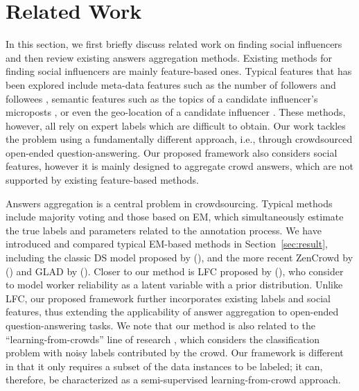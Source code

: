 \section{Related Work}

In this section, we first briefly discuss related work on finding social influencers and then review existing answers aggregation methods. Existing methods for finding social influencers are mainly feature-based ones. Typical features that has been explored include meta-data features such as the number of followers and followees \cite{Lehmann2013,Cheng2014}, semantic features such as the topics of a candidate influencer's microposts \cite{riahi2012finding,wei2016learning}, or even the geo-location of a candidate influencer \cite{Cheng2014} . These methods, however, all rely on expert labels which are difficult to obtain. Our work tackles the problem using a fundamentally different approach, i.e., through crowdsourced open-ended question-answering. Our proposed framework also considers social features, however it is mainly designed to aggregate crowd answers, which are not supported by existing feature-based methods.


Answers aggregation is a central problem in crowdsourcing. Typical methods include majority voting \cite{sheng2008get} and those based on EM, which simultaneously estimate the true labels and parameters related to the annotation process. We have introduced and compared typical EM-based methods in Section~\ref{sec:result}, including the classic DS model proposed by \citeauthor{dawid1979maximum} (\citeyear{dawid1979maximum}), and the more recent ZenCrowd by \citeauthor{demartini2012zencrowd} (\citeyear{demartini2012zencrowd}) and GLAD by \citeauthor{whitehill2009whose} (\citeyear{whitehill2009whose}). Closer to our method is LFC proposed by \citeauthor{raykar2010learning} (\citeyear{raykar2010learning}), who consider to model worker reliability as a latent variable with a prior distribution. Unlike LFC, our proposed framework further incorporates existing labels and social features, thus extending the applicability of answer aggregation to open-ended question-answering tasks. We note that our method is also related to the ``learning-from-crowds'' line of research \cite{raykar2010learning,tian2012learning,yang2018leveraging}, which considers the classification problem with noisy labels contributed by the crowd. Our framework is different in that it only requires a subset of the data instances to be labeled; it can, therefore, be characterized as a semi-supervised learning-from-crowd approach. 